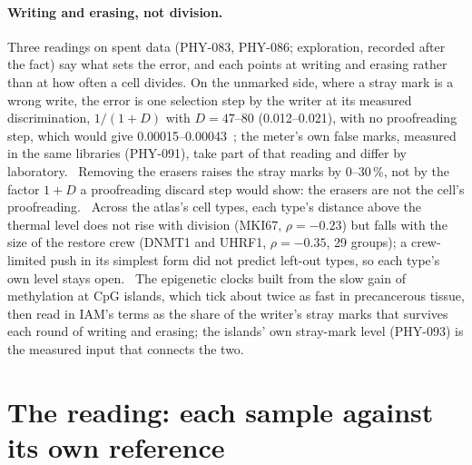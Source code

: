 \paragraph{Writing and erasing, not division.} Three readings on spent data (PHY-083, PHY-086; exploration, recorded after the fact) say what
sets the error, and each points at writing and erasing rather than at how often a cell divides. On the unmarked side, where a stray mark is
a wrong write, the error is one selection step by the writer at its measured discrimination, $1/(1+D)$ with $D=47$--$80$ (0.012--0.021),
with no proofreading step, which would give 0.00015--0.00043~\cite{Hopfield1974}; the meter's own false marks, measured in the same
libraries (PHY-091), take part of that reading and differ by laboratory. \measured\ Removing the erasers raises the stray marks by 0--30\,\%,
not by the factor $1+D$ a proofreading discard step would show: the erasers are not the cell's proofreading. \measured\ Across the atlas's
cell types, each type's distance above the thermal level does not rise with division (MKI67, $\rho=-0.23$) but falls with the size of the
restore crew (DNMT1 and UHRF1, $\rho=-0.35$, 29 groups); a crew-limited push in its simplest form did not predict left-out types, so each
type's own level stays open. \interp\ The epigenetic clocks built from the slow gain of methylation at CpG islands, which tick about twice
as fast in precancerous tissue, then read in IAM's terms as the share of the writer's stray marks that survives each round of writing and
erasing; the islands' own stray-mark level (PHY-093) is the measured input that connects the two. \openprob

\section{The reading: each sample against its own reference}

